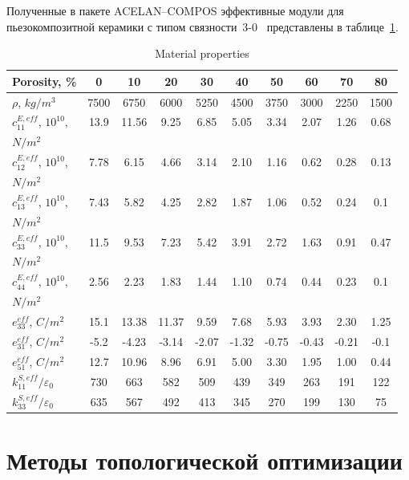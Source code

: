 Полученные в пакете ACELAN--COMPOS эффективные модули для пьезокомпозитной керамики с типом связности~3-0~\cite{Nasedkin2020} представлены в таблице~\ref{t:1}.
\begin{table}    \centering
	\caption{Material properties}\label{t:1}
	\begin{tabular}{|l|c|c|c|c|c|c|c|c|c|}
		\hline
		Porosity, \% &  0  & 10 & 20 & 30 & 40 & 50 &  60  & 70 & 80 \\ \hline
		$\rho$, $kg/m^3$ &  7500  & 6750 & 6000 & 5250 & 4500 & 3750 & 3000 & 2250 & 1500 \\ \hline
		$c_{11}^{E,eff}$, $10^{10}$,  & 13.9 & 11.56 & 9.25 & 6.85 & 5.05 & 3.34 & 2.07 & 1.26 & 0.68 \\ 
		$N/m^2$ &  &  &  &  &  &  &  &  &  \\ \hline
		$c_{12}^{E,eff}$, $10^{10}$, & 7.78 & 6.15 & 4.66 & 3.14 & 2.10 & 1.16 & 0.62 & 0.28 & 0.13 \\ 
		$N/m^2$ &  &  &  &  &  &  &  &  &  \\ \hline
		$c_{13}^{E,eff}$, $10^{10}$, & 7.43 & 5.82 & 4.25 & 2.82 & 1.87 & 1.06 & 0.52 & 0.24 & 0.1 \\ 
		$N/m^2$ &  &  &  &  &  &  &  &  &  \\ \hline
		$c_{33}^{E,eff}$, $10^{10}$, & 11.5 & 9.53 & 7.23 & 5.42 & 3.91 & 2.72 & 1.63 & 0.91 & 0.47 \\ 
		$N/m^2$ &  &  &  &  &  &  &  &  &  \\ \hline
		$c_{44}^{E,eff}$, $10^{10}$, & 2.56 & 2.23 & 1.83 & 1.44 & 1.10 & 0.74 & 0.44 & 0.23 & 0.1 \\ 
		$N/m^2$ &  &  &  &  &  &  &  &  &  \\ \hline
		$e_{33}^{eff}$, $C/m^2$ & 15.1 & 13.38 & 11.37 & 9.59 & 7.68 & 5.93 & 3.93 & 2.30 & 1.25 \\ \hline
		$e_{31}^{eff}$, $C/m^2$ & -5.2 & -4.23 & -3.14 & -2.07 & -1.32 & -0.75 & -0.43 & -0.21 & -0.1 \\ \hline
		$e_{51}^{eff}$, $C/m^2$ & 12.7 & 10.96 & 8.96 & 6.91 & 5.00 & 3.30 & 1.95 & 1.00 & 0.44 \\ \hline
		$k_{11}^{S,eff}/\varepsilon_0$ & 730 & 663 & 582 & 509 & 439 & 349 & 263 & 191 & 122 \\ \hline
		$k_{33}^{S,eff}/\varepsilon_0$ & 635 & 567 & 492 & 413 & 345 & 270 & 199 & 130 & 75 \\ \hline
	\end{tabular}
\end{table}


\section{Методы топологической оптимизации}\label{sec:ch1/sec4}

